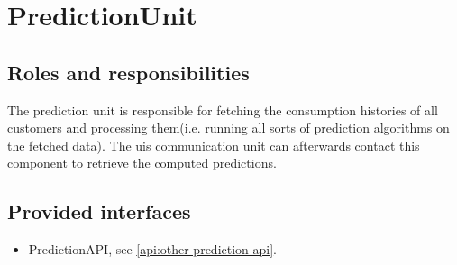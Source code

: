 \section{PredictionUnit}
\label{element:prediction-unit}

\subsection{Roles and responsibilities}

\npar The prediction unit is responsible for fetching the consumption
histories of all customers and processing them(i.e. running all sorts of
prediction algorithms on the fetched data). The uis communication unit can
afterwards contact this component to retrieve the computed predictions.

\subsection{Provided interfaces}

\begin{itemize}
  \item PredictionAPI, see \ref{api:other-prediction-api}.
\end{itemize}